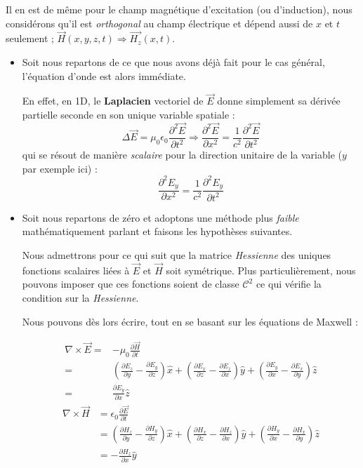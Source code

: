 Il en est de même pour le champ magnétique d'excitation (ou d'induction), nous considérons qu'il est 
\textit{orthogonal} au champ électrique et dépend aussi de $x$ et $t$ seulement ; $\vec{H}(x,y,z,t) \Rightarrow \vec{H_{z}}(x,t)$. 

\begin{itemize}
	\item
Soit nous repartons de ce que nous avons déjà fait pour le cas général, l'équation d'onde est alors immédiate.

En effet, en 1D, le \textbf{Laplacien} vectoriel de $\vec{E}$ donne simplement sa dérivée partielle seconde en son unique variable
spatiale : 
\[ \Delta \vec{E} = \mu_{0} \epsilon_{0}  \frac{\partial^{2} \vec{E}}{\partial t^{2}} \Rightarrow \frac{\partial^{2} \vec{E} }{\partial x^2} = \frac{1}{c^{2}}  \frac{\partial^{2} \vec{E}}{\partial t^{2}}\]
qui se résout de manière \textit{scalaire} pour la direction unitaire de la variable ($y$ par exemple ici) : 
\[\frac{\partial^{2} E_{y}}{\partial x^{2}} = \frac{1}{c^{2}}  \frac{\partial^{2} E_{y}}{\partial t^{2}}\]


\item Soit nous repartons de zéro et adoptons une méthode plus \textit{faible} mathématiquement parlant et faisons les hypothèses suivantes.

Nous admettrons pour ce qui suit que la matrice \textit{Hessienne} des uniques fonctions scalaires liées à $\vec{E}$ et $\vec{H}$ soit symétrique. 
Plus particulièrement, nous pouvons imposer que ces fonctions soient de classe $\mathcal{C}^{2}$ ce qui vérifie la condition sur la \textit{Hessienne}.

Nous pouvons dès lors écrire, tout en se basant sur les équations de Maxwell : 


\begin{equation*}
	\begin{split}
\nabla \times \vec{E} =& -\mu_{0} \frac{\partial \vec{H}}{\partial t} \\=& \left(\frac{\partial E_{z}}{\partial y} - \frac{\partial E_{y}}{\partial z}\right)\hat{x} +   \left(\frac{\partial E_{x}}{\partial z} - \frac{\partial E_{z}}{\partial x}\right)\hat{y} +
\left(\frac{\partial E_{y}}{\partial x} - \frac{\partial E_{x}}{\partial y}\right)\hat{z} \\=& \frac{\partial E_{y}}{\partial x} \hat{z}
	\end{split}
\end{equation*}
\begin{equation*}
\begin{split}
\nabla \times \vec{H} &= \epsilon_{0} \frac{\partial \vec{E}}{\partial t} \\&= \left(\frac{\partial H_{z}}{\partial y} - \frac{\partial H_{y}}{\partial z}\right)\hat{x} +   \left(\frac{\partial H_{x}}{\partial z} - \frac{\partial H_{z}}{\partial x}\right)\hat{y} +
\left(\frac{\partial H_{y}}{\partial x} - \frac{\partial H_{x}}{\partial y}\right)\hat{z} \\&= -\frac{\partial H_{z}}{\partial x} \hat{y}
	\end{split}
\end{equation*}


\end{itemize}
